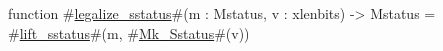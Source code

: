 function #\hyperref[sailRISCVzlegalizzezysstatus]{legalize\_sstatus}#(m : Mstatus, v : xlenbits) -> Mstatus = {
  #\hyperref[sailRISCVzliftzysstatus]{lift\_sstatus}#(m, #\hyperref[sailRISCVzMkzySstatus]{Mk\_Sstatus}#(v))
}
